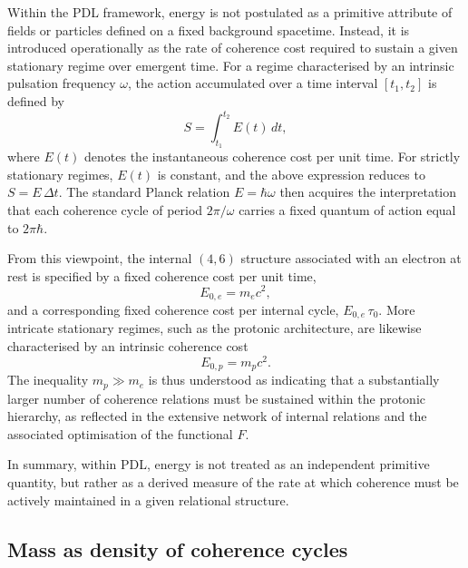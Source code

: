 \documentclass[11pt,a4paper]{article}
\begin{document}
Within the PDL framework, energy is not postulated as a primitive attribute of fields or particles defined on a fixed background spacetime. Instead, it is introduced operationally as the rate of coherence cost required to sustain a given stationary regime over emergent time.\cite{Laubscher2026IntroPDL,Laubscher2026LDP_French} For a regime characterised by an intrinsic pulsation frequency $\omega$, the action accumulated over a time interval $[t_1,t_2]$ is defined by
\begin{equation}
S = \int_{t_1}^{t_2} E(t)\,dt,
\end{equation}
where $E(t)$ denotes the instantaneous coherence cost per unit time. For strictly stationary regimes, $E(t)$ is constant, and the above expression reduces to $S = E\,\Delta t$. The standard Planck relation $E = \hbar \omega$ then acquires the interpretation that each coherence cycle of period $2\pi/\omega$ carries a fixed quantum of action equal to $2\pi\hbar$.\par

From this viewpoint, the internal $(4,6)$ structure associated with an electron at rest is specified by a fixed coherence cost per unit time,
\[
E_{0,e} = m_e c^{2},
\]
and a corresponding fixed coherence cost per internal cycle, $E_{0,e}\,\tau_{0}$. More intricate stationary regimes, such as the protonic architecture, are likewise characterised by an intrinsic coherence cost
\[
E_{0,p} = m_p c^{2}.
\]
The inequality $m_p \gg m_e$ is thus understood as indicating that a substantially larger number of coherence relations must be sustained within the protonic hierarchy, as reflected in the extensive network of internal relations and the associated optimisation of the functional $F$.\cite{Laubscher2026PDL_English,Laubscher2026LDP_French}\par

In summary, within PDL, energy is not treated as an independent primitive quantity, but rather as a derived measure of the rate at which coherence must be actively maintained in a given relational structure.

\subsection{Mass as density of coherence cycles}
\end{document}
